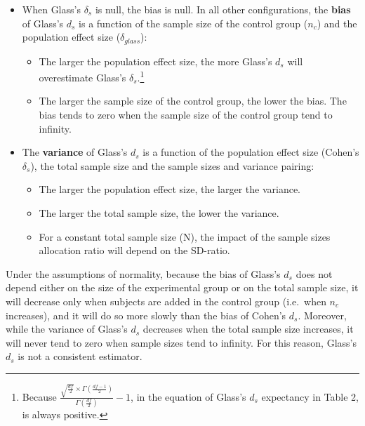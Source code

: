 \documentclass[
  man,floatsintext]{apa6}
\providecommand{\tightlist}{%
  \setlength{\itemsep}{0pt}\setlength{\parskip}{0pt}}
\begin{document}
\begin{itemize}
\item
  When Glass's \(\delta_s\) is null, the bias is null. In all other configurations, the \textbf{bias} of Glass's \(d_s\) is a function of the sample size of the control group (\(n_c\)) and the population effect size (\(\delta_{glass}\)):

  \begin{itemize}
  \tightlist
  \item
    The larger the population effect size, the more Glass's \(d_s\) will overestimate Glass's \(\delta_s\).\footnote{Because  $\frac{\sqrt{\frac{df}{2}} \times \Gamma(\frac{df-1}{2})}{\Gamma(\frac{df}{2})}-1$, in the equation of Glass's $d_s$ expectancy in Table 2, is always positive.}\\
  \item
    The larger the sample size of the control group, the lower the bias. The bias tends to zero when the sample size of the control group tend to infinity.
  \end{itemize}
\item
  The \textbf{variance} of Glass's \(d_s\) is a function of the population effect size (Cohen's \(\delta_s\)), the total sample size and the sample sizes and variance pairing:

  \begin{itemize}
  \tightlist
  \item
    The larger the population effect size, the larger the variance.\\
  \item
    The larger the total sample size, the lower the variance.\\
  \item
    For a constant total sample size (N), the impact of the sample sizes allocation ratio will depend on the SD-ratio.
  \end{itemize}
\end{itemize}

Under the assumptions of normality, because the bias of Glass's \(d_s\) does not depend either on the size of the experimental group or on the total sample size, it will decrease only when subjects are added in the control group (i.e.~when \(n_c\) increases), and it will do so more slowly than the bias of Cohen's \(d_s\). Moreover, while the variance of Glass's \(d_s\) decreases when the total sample size increases, it will never tend to zero when sample sizes tend to infinity. For this reason, Glass's \(d_s\) is not a consistent estimator.
\end{document}
